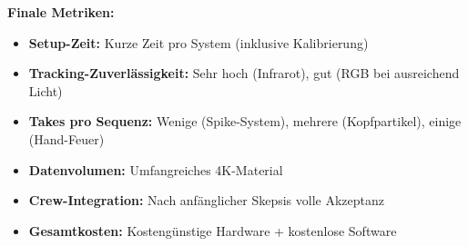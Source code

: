 \textbf{Finale Metriken:}
\begin{itemize}
   \item \textbf{Setup-Zeit:} Kurze Zeit pro System (inklusive Kalibrierung)
   \item \textbf{Tracking-Zuverlässigkeit:} Sehr hoch (Infrarot), gut (RGB bei ausreichend Licht)
   \item \textbf{Takes pro Sequenz:} Wenige (Spike-System), mehrere (Kopfpartikel), einige (Hand-Feuer)
   \item \textbf{Datenvolumen:} Umfangreiches 4K-Material
   \item \textbf{Crew-Integration:} Nach anfänglicher Skepsis volle Akzeptanz
   \item \textbf{Gesamtkosten:} Kostengünstige Hardware + kostenlose Software
\end{itemize}